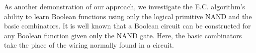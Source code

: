 \documentclass{article}
\begin{document}
As another demonstration of our approach, we investigate the
E.C. algorithm's ability to learn Boolean functions using only the logical
primitive NAND and the basic combinators. It is well known that a
Boolean circuit can be constructed for any Boolean function given only
the NAND gate. Here, the basic combinators take the place of the
wiring normally found in a circuit.






\end{document}
